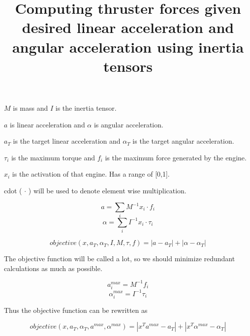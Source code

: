 \documentclass{article}
\begin{document}
\title{Computing thruster forces given desired linear acceleration and angular acceleration using inertia tensors}
\maketitle
$M$ is mass and $I$ is the inertia tensor.

$a$ is linear acceleration and $\alpha$ is angular acceleration.

$a_T$ is the target linear acceleration and $\alpha_T$ is the target angular acceleration.

$\tau_i$ is the maximum torque and $f_i$ is the maximum force generated by the engine. 

$x_i$ is the activation of that engine. Has a range of [0,1].

cdot ( $\cdot$ ) will be used to denote element wise multiplication.

$$ a = \sum_i M^{-1} x_i \cdot f_i$$
$$ \alpha = \sum_i I^{-1} x_i \cdot \tau_i $$

$$ objective(x, a_T, \alpha_T, I, M, \tau, f) = |a - a_T|  + |\alpha - \alpha_T| $$

The objective function will be called a lot, so we should minimize redundant calculations as much as possible.

$$ a^{max}_i = M^{-1} f_i$$
$$ \alpha^{max}_i = I^{-1} \tau_i $$

Thus the objective function can be rewritten as

$$ objective(x, a_T, \alpha_T, a^{max}, \alpha^{max}) = |x^T a^{max} - a_T|  + |x^T \alpha^{max} - \alpha_T| $$
\end{document}
